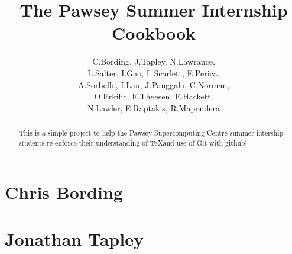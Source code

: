 \documentclass[11pt,a4paper]{report}
\title{The Pawsey Summer Internship Cookbook}
\author{C.Bording, J.Tapley, N.Lawrance,\\
L.Salter, I.Gao, L.Scarlett, E.Perica,\\
A.Sorbello, I.Lau, J.Panggalo, C.Norman,\\
O.Erkilic, E.Thgesen, E.Hackett,\\
N.Lawler, E.Raptakis, R.Mapondera}
\begin{document}
\maketitle
\tableofcontents


\begin{abstract}

This is a simple project to help the Pawsey Supercomputing Centre summer intership students re-enforce their understanding of \TeX and use of Git with github!

\end{abstract}

\chapter{Chris Bording}


\chapter{Jonathan Tapley}

\end{document}
